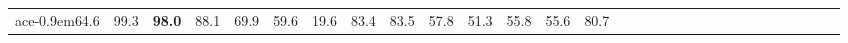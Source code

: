 \begin{table*}[]
\begin{tabular}{cc|cccccccccccccccccccccccccccc}
ace{-0.9em}64.6\hspace{-0.4em} & \hspace{-0.9em}99.3\hspace{-0.4em} & \hspace{-0.9em}\textbf{98.0}\hspace{-0.4em} & \hspace{-0.9em}88.1\hspace{-0.4em} & \hspace{-0.9em}69.9\hspace{-0.4em} & \hspace{-0.9em}59.6\hspace{-0.4em} & \hspace{-0.9em}19.6\hspace{-0.4em} & \hspace{-0.9em}83.4\hspace{-0.4em} & \hspace{-0.9em}83.5\hspace{-0.4em} & \hspace{-0.9em}57.8\hspace{-0.4em} & \hspace{-0.9em}51.3\hspace{-0.4em} & \hspace{-0.9em}55.8\hspace{-0.4em} & \hspace{-0.9em}55.6\hspace{-0.4em} & \hspace{-0.9em}80.7\hspace{-0.4em} 
        \\

\end{tabular}
\end{table*}
